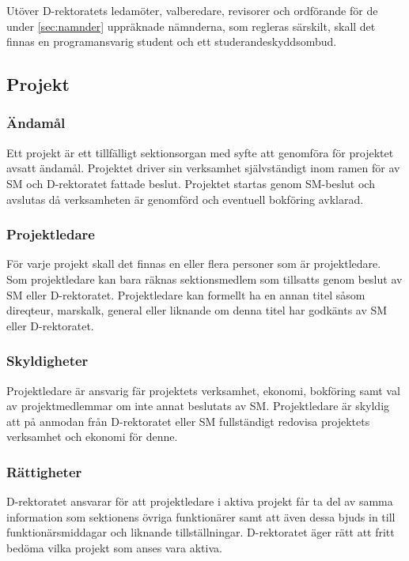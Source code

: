 \documentclass{dgovdoc}
\begin{document}
Utöver D-rektoratets ledamöter, valberedare, revisorer och ordförande för de
under \ref{sec:namnder} uppräknade nämnderna, som regleras särskilt, skall det
finnas en programansvarig student och ett studerandeskyddsombud.

\subsection{Projekt}

\subsubsection{Ändamål}

Ett projekt är ett tillfälligt sektionsorgan med syfte att genomföra för
projektet avsatt ändamål. Projektet driver sin verksamhet självständigt inom
ramen för av SM och D-rektoratet fattade beslut. Projektet startas genom
SM-beslut och avslutas då verksamheten är genomförd och eventuell bokföring
avklarad.

\subsubsection{Projektledare}

För varje projekt skall det finnas en eller flera personer som är
projektledare. Som projektledare kan bara räknas sektionsmedlem som tillsatts
genom beslut av SM eller D-rektoratet. Projektledare kan formellt ha en annan
titel såsom direqteur, marskalk, general eller liknande om denna titel har
godkänts av SM eller D-rektoratet.

\subsubsection{Skyldigheter}

Projektledare är ansvarig fär projektets verksamhet, ekonomi, bokföring samt
val av projektmedlemmar om inte annat beslutats av SM. Projektledare är
skyldig att på anmodan från D-rektoratet eller SM fullständigt redovisa
projektets verksamhet och ekonomi för denne.

\subsubsection{Rättigheter}

D-rektoratet ansvarar för att projektledare i aktiva projekt får ta del av
samma information som sektionens övriga funktionärer samt att även dessa bjuds
in till funktionärsmiddagar och liknande tillställningar. D-rektoratet äger
rätt att fritt bedöma vilka projekt som anses vara aktiva.
\end{document}
